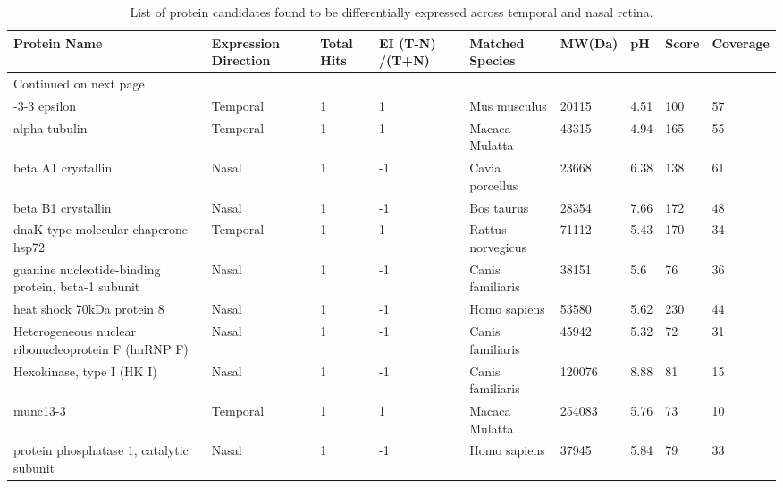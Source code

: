 \documentclass[12pt]{report}
\begin{document}
\begin{center}\scriptsize
\begin{longtable}{m{} m{} m{} m{} m{} m{} m{} m{} m{}}
\caption[List of protein candidates found to be differentially expressed across temporal and nasal retina.]{List of protein candidates found to be differentially expressed across temporal and nasal retina.} \\
\hline
{\bf Protein Name} & {\bf Expression Direction} & {\bf Total Hits} & {\bf EI \newline(T-N) /(T+N)} & {\bf Matched Species} & {\bf MW\newline(Da)} & {\bf pH} & {\bf Score} & {\bf Coverage} \\ 
\hline
\endfirsthead
\endhead
\hline
{{Continued on next page}} \\ 
\hline
\endfoot
\hline \hline
\endlastfoot
14-3-3 epsilon & Temporal & 1 & 1 & Mus musculus   & 20115 & 4.51 &	100	& 57\\
    alpha tubulin  & Temporal & 1 & 1 & Macaca Mulatta	 & 43315	& 4.94 & 165	& 55\\
    beta A1 crystallin	&Nasal	&1	&-1	&Cavia porcellus	&23668	&6.38	&138 &	61\\
	beta B1 crystallin	&Nasal	&1	&-1	&Bos taurus	&28354	&7.66	&172	 &48\\
	dnaK-type molecular chaperone hsp72	&Temporal	&1	&1	&Rattus norvegicus	&71112	&5.43	&170 &	34\\
	guanine nucleotide-binding protein, beta-1 subunit	&Nasal	&1	&-1	&Canis familiaris	&38151	&5.6 &	76	&36\\
	heat shock 70kDa protein 8	&Nasal	&1	&-1	&Homo sapiens	&53580	&5.62	&230&	44\\
	Heterogeneous nuclear ribonucleoprotein F (hnRNP F)	&Nasal	&1	&-1	&Canis familiaris	&45942	&5.32	&72	&31\\
	Hexokinase, type I (HK I)	&Nasal	&1	&-1	&Canis familiaris	&120076	&8.88	&81	&15\\
	munc13-3	&Temporal	&1	&1	&Macaca Mulatta	&254083	&5.76	&73	&10\\
	protein phosphatase 1, catalytic subunit	&Nasal	&1	&-1	&Homo sapiens	&37945	&5.84	&79	&33\\
\end{longtable}
\end{center}
\end{document}
